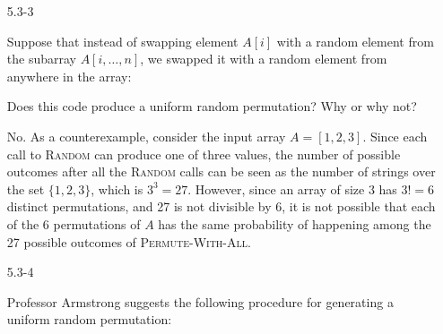 \begin{enumerate}
{Does this code do what Professor Kelp intends?
}

\begin{framed}
No. This code enforces that every position $i$ of the resulting array receives
an element that is different from the $i$th element of the original array.
However, this requirement discards much more permutations than just the identity
permutation. For instance, consider the array $A = [1, 2, 3]$ and a permutation
of it $A' = [1, 3, 2]$. In this case, the permutation $A'$ is not identical
to the original array $A$. However, Professor Kelp's code is not able to produce
this permutation.
\end{framed}

\item[5.3{-}3]{Suppose that instead of swapping element $A[i]$ with a random
element from the subarray $A[i, \dots, n]$, we swapped it with a random element
from anywhere in the array:

\begin{algorithm}[H]
\SetAlgoNoEnd\DontPrintSemicolon
\BlankLine
{}
\end{algorithm}

Does this code produce a uniform random permutation? Why or why not?
}

\begin{framed}
No. As a counterexample, consider the input array $A = [1, 2, 3]$. Since each
call to \textsc{Random} can produce one of three values, the number of possible
outcomes after all the \textsc{Random} calls can be seen as the number of
strings over the set $\{1, 2, 3\}$, which is $3^3 = 27$. However, since an array
of size $3$ has $3! = 6$ distinct permutations, and 27 is not divisible by 6, it
is not possible that each of the 6 permutations of $A$ has the same probability
of happening among the 27 possible outcomes of \textsc{Permute-With-All}.
\end{framed}

\newpage

\item[5.3{-}4]{Professor Armstrong suggests the following procedure for
generating a uniform random permutation:

\begin{algorithm}[H]
\SetAlgoNoEnd\DontPrintSemicolon
\BlankLine
{}
\end{algorithm}

}
\end{enumerate}
